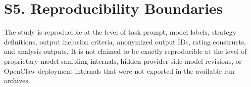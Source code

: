\section{S5. Reproducibility Boundaries}

The study is reproducible at the level of task prompt, model labels, strategy definitions, output inclusion criteria, anonymized output IDs, rating constructs, and analysis outputs. It is not claimed to be exactly reproducible at the level of proprietary model sampling internals, hidden provider-side model revisions, or OpenClaw deployment internals that were not exported in the available run archives.
